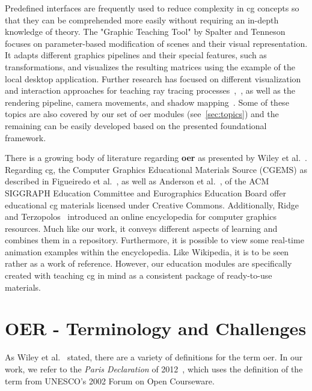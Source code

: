 Predefined interfaces are frequently used to reduce complexity in \acrshort{cg} concepts so that they can be comprehended more easily without requiring an in-depth knowledge of theory. The "Graphic Teaching Tool" by Spalter and Tenneson~\cite{Spalter:2006:cg-tool} focuses on parameter-based modification of scenes and their visual representation. It adapts different graphics pipelines and their special features, such as transformations, and visualizes the resulting matrices using the example of the local desktop application. Further research has focused on different visualization and interaction approaches for teaching ray tracing processes~\cite{Suselo:2018:cg-tool},~\cite{ Verschoore-de-la-Houssaije:2022:cg-tool}, as well as the rendering pipeline, camera movements, and shadow mapping~\cite{Eisemann:2023:cg-tool}. Some of these topics are also covered by our set of \acrshort{oer} modules (see~\autoref{sec:topics}) and the remaining can be easily developed based on the presented foundational framework.

There is a growing body of literature regarding \textbf{\acrfull{oer}} as presented by Wiley et al.~\cite{wiley:2014:oer}. Regarding \acrshort{cg}, the Computer Graphics Educational Materials Source (CGEMS) as described in Figueiredo et al.~\cite{figueiredo:2003:cgems}, \cite{figueiredo:2004:cgems2} as well as Anderson et al.~\cite{anderson:2017:NewCGEMS}, of the ACM SIGGRAPH Education Committee and Eurographics Education Board offer educational \acrshort{cg} materials licensed under Creative Commons. Additionally, Ridge and Terzopolos~\cite{ridge:2019:ecosystem} introduced an online encyclopedia for computer graphics resources. Much like our work, it conveys different aspects of learning and combines them in a repository. Furthermore, it is possible to view some real-time animation examples within the encyclopedia. Like Wikipedia, it is to be seen rather as a work of reference. However, our education modules are specifically created with teaching \acrshort{cg} in mind as a consistent package of ready-to-use materials. %


\section{OER - Terminology and Challenges \label{sec:challenges}} %
As Wiley et al.~\cite{wiley:2014:oer} stated, there are a variety of definitions for the term \acrshort{oer}. In our work, we refer to the \emph{Paris Declaration} of 2012~\cite{declaration:2012:paris}, which uses the definition of the term from UNESCO’s 2002 Forum on Open Courseware.

